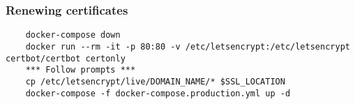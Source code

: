 \subsubsection{Renewing certificates} \label{section:certificate-renewal}

\begin{verbatim}
	docker-compose down
	docker run --rm -it -p 80:80 -v /etc/letsencrypt:/etc/letsencrypt certbot/certbot certonly
	*** Follow prompts ***
	cp /etc/letsencrypt/live/DOMAIN_NAME/* $SSL_LOCATION
	docker-compose -f docker-compose.production.yml up -d
\end{verbatim}
